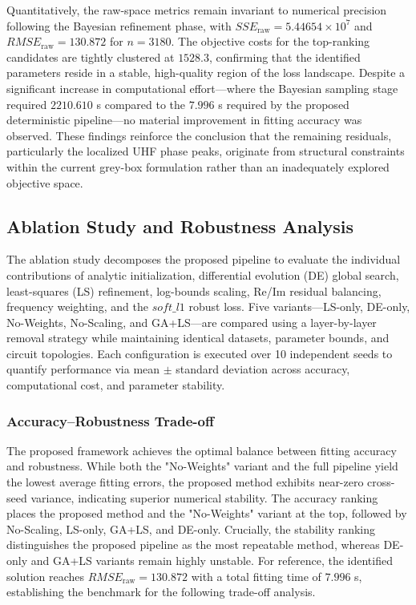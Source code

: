 \documentclass[12pt,a4paper]{article}
\begin{document}
Quantitatively, the raw-space metrics remain invariant to numerical precision following the Bayesian refinement phase, with $SSE_{\text{raw}} = 5.44654 \times 10^7$ and $RMSE_{\text{raw}} = 130.872$ for $n = 3180$. The objective costs for the top-ranking candidates are tightly clustered at $1528.3$, confirming that the identified parameters reside in a stable, high-quality region of the loss landscape. Despite a significant increase in computational effort—where the Bayesian sampling stage required $2210.610$ s compared to the $7.996$ s required by the proposed deterministic pipeline—no material improvement in fitting accuracy was observed. These findings reinforce the conclusion that the remaining residuals, particularly the localized UHF phase peaks, originate from structural constraints within the current grey-box formulation rather than an inadequately explored objective space.

\subsection{Ablation Study and Robustness Analysis}
The ablation study decomposes the proposed pipeline to evaluate the individual contributions of analytic initialization, differential evolution (DE) global search, least-squares (LS) refinement, log-bounds scaling, Re/Im residual balancing, frequency weighting, and the $soft\_l1$ robust loss. Five variants—LS-only, DE-only, No-Weights, No-Scaling, and GA+LS—are compared using a layer-by-layer removal strategy while maintaining identical datasets, parameter bounds, and circuit topologies. Each configuration is executed over 10 independent seeds to quantify performance via mean $\pm$ standard deviation across accuracy, computational cost, and parameter stability.

\subsubsection{Accuracy–Robustness Trade-off}
The proposed framework achieves the optimal balance between fitting accuracy and robustness. While both the "No-Weights" variant and the full pipeline yield the lowest average fitting errors, the proposed method exhibits near-zero cross-seed variance, indicating superior numerical stability. The accuracy ranking places the proposed method and the "No-Weights" variant at the top, followed by No-Scaling, LS-only, GA+LS, and DE-only. Crucially, the stability ranking distinguishes the proposed pipeline as the most repeatable method, whereas DE-only and GA+LS variants remain highly unstable. For reference, the identified solution reaches $RMSE_{\text{raw}} = 130.872$ with a total fitting time of $7.996$ s, establishing the benchmark for the following trade-off analysis.
\end{document}

